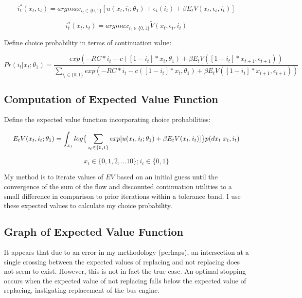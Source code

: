 \documentclass{article}
\begin{document}
\begin{equation}
i_t^*( x_t, \epsilon_t ) = argmax_{ i_t \in \{ 0, 1 \} } [ u( x_t, i_t; \theta_1 ) + \epsilon_t( i_t ) + \beta E_t V( x_t, \epsilon_t, i_t ) ]
\end{equation}

\begin{equation}
i_t^*( x_t, \epsilon_t ) = argmax_{ i_t \in \{ 0, 1 \} } \tilde{V} ( x_t, \epsilon_t, i_t )
\end{equation}

\noindent Define choice probability in terms of continuation value:

\begin{equation}
Pr( i_t | x_t; \theta_1 ) = \frac{ exp( -RC * i_t - c( [ 1 - i_t ] * x_t, \theta_1 ) + \beta E_t V ( [ 1 - i_t ] * x_{ t+1 }, \epsilon_{ t+1 } ) ) }{ \sum_{ i_t \in \{ 0, 1 \} } exp( -RC * i_t - c( [ 1 - i_t ] * x_t, \theta_1 ) + \beta E_t V ( [ 1 - i_t ] * x_{ t+1 }, \epsilon_{ t+1 } ) ) }
\end{equation}

\subsection{Computation of Expected Value Function}

Define the expected value function incorporating choice probabilities:

\begin{equation}
E_t V ( x_t, i_t; \theta_1 ) = \int_{ x_t } log \big{\{} \sum_{ i_t \in \{ 0, 1 \} } exp[ u( x_t, i_t; \theta_1 ) + \beta E_t V( x_t, i_t ) ] \big{\}} p( dx_t | x_t, i_t )
\end{equation}

\begin{equation}
x_t \in \{ 0, 1, 2, ... 10 \}; i_t \in \{ 0, 1 \}
\end{equation}

My method is to iterate values of $EV$ based on an initial guess until the convergence of the sum of the flow and discounted continuation utilities to a small difference in comparison to prior iterations within a tolerance band. I use these expected values to calculate my choice probability.

\subsection{Graph of Expected Value Function}

It appears that due to an error in my methodology (perhaps), an intersection at a single crossing between the expected values of replacing and not replacing does not seem to exist. However, this is not in fact the true case. An optimal stopping occurs when the expected value of not replacing falls below the expected value of replacing, instigating replacement of the bus engine.
\end{document}
